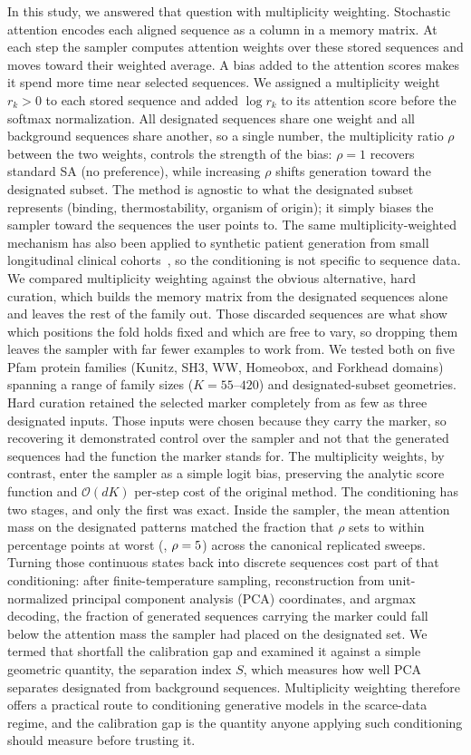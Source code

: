 In this study, we answered that question with multiplicity weighting. Stochastic attention
encodes each aligned sequence as a column in a memory matrix. At each step the sampler
computes attention weights over these stored sequences and moves toward their weighted average.
A bias added to the attention scores makes it spend more time near selected sequences. We
assigned a multiplicity weight $r_k > 0$ to each stored sequence and added $\log r_k$ to its
attention score before the softmax normalization. All designated sequences share one weight and all
background sequences share another, so a single number, the multiplicity ratio $\rho$ between
the two weights, controls the strength of the bias: $\rho = 1$ recovers standard SA (no
preference), while increasing $\rho$ shifts generation toward the designated subset. 
The method is agnostic to what the designated subset represents (binding, thermostability, organism of origin); it simply biases the sampler toward the sequences the user points to. 
The same multiplicity-weighted mechanism has also been applied to synthetic patient generation
from small longitudinal clinical cohorts~\cite{varnerSAPatient2026}, so the conditioning is not
specific to sequence data. We compared multiplicity weighting against the obvious alternative,
hard curation, which builds the memory matrix from the designated sequences alone and leaves
the rest of the family out. Those discarded sequences are what show which
positions the fold holds fixed and which are free to vary, so dropping them leaves the sampler
with far fewer examples to work from. We tested both on five
Pfam protein families (Kunitz, SH3, WW, Homeobox, and Forkhead domains) spanning a range of
family sizes ($K = 55$--$420$) and designated-subset geometries. Hard curation retained the
selected marker completely from as few as three designated inputs. Those inputs were chosen
because they carry the marker, so recovering it demonstrated control over the sampler and not
that the generated sequences had the function the marker stands for. The multiplicity weights,
by contrast, enter the sampler as a simple logit bias, preserving the analytic score function and
$\mathcal{O}(dK)$ per-step cost of the original method. The conditioning has two stages, and only the
first was exact. Inside the sampler, the mean attention mass on the designated patterns matched
the fraction that $\rho$ sets to within \AttnMaxDevPts{} percentage points at worst
(\AttnMaxDevFamily{}, $\rho=5$) across the canonical replicated sweeps. Turning
those continuous states back into discrete sequences cost part of that conditioning: after
finite-temperature sampling, reconstruction from unit-normalized principal component analysis
(PCA) coordinates, and argmax decoding, the fraction of generated sequences carrying the marker
could fall below the attention mass the sampler had placed on the designated set. We termed that
shortfall the calibration gap and examined it against a simple geometric quantity, the
separation index $S$, which measures how well PCA separates designated from background
sequences. Multiplicity weighting therefore offers a practical route to
conditioning generative models in the scarce-data regime, and the calibration gap is the
quantity anyone applying such conditioning should measure before trusting it.
